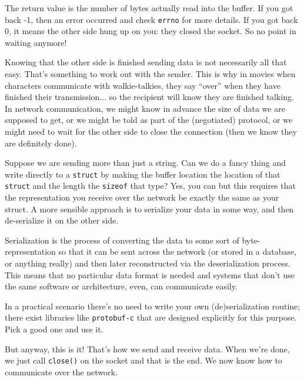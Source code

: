 The return value is the number of bytes actually read into the buffer. If you got back -1, then an error occurred and check \texttt{errno} for more details. If you got back 0, it means the other side hung up on you: they closed the socket. So no point in waiting anymore!

Knowing that the other side is finished sending data is not necessarily all that easy. That's something to work out with the sender. This is why in movies when characters communicate with walkie-talkies, they say ``over'' when they have finished their transmission... so the recipient will know they are finished talking. In network communication, we might know in advance the size of data we are supposed to get, or we might be told as part of the (negotiated) protocol, or we might need to wait for the other side to close the connection (then we know they are definitely done).

Suppose we are sending more than just a string. Can we do a fancy thing and write directly to a \texttt{struct} by making the buffer location the location of that \texttt{struct} and the length the \texttt{sizeof} that type? Yes, you can but this requires that the representation you receive over the network be exactly the same as your struct. A more sensible approach is to serialize your data in some way, and then de-serialize it on the other side.

Serialization is the process of converting the data to some sort of byte-representation so that it can be sent across the network (or stored in a database, or anything really) and then later reconstructed via the deserialization process. This means that no particular data format is needed and systems that don't use the same software or architecture, even, can communicate easily.

In a practical scenario there's no need to write your own (de)serialization routine; there exist libraries like \texttt{protobuf-c} that are designed explicitly for this purpose. Pick a good one and use it.

But anyway, this is it! That's how we send and receive data. When we're done, we just call \texttt{close()} on the socket and that is the end. We now know how to communicate over the network.


